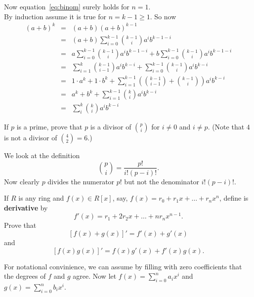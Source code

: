 \begin{myenumerate}
Now equation~\ref{eq:binom} surely holds for \(n=1\).\\
By induction assume it is true for \(n=k-1\geq 1\).
So now
\begin{eqnarray*}
(a+b)^k
  & = & (a+b)(a+b)^{k-1}\\
  & = & (a+b) \sum_{i=0}^{k-1} {\binom{k-1}{i}} a^ib^{k-1-i} \\
  & = & a \sum_{i=0}^{k-1} {\binom{k-1}{i}} a^ib^{k-1-i} +
        b \sum_{i=0}^{k-1} {\binom{k-1}{i}} a^ib^{k-1-i} \\
  & = & \sum_{i=1}^k {\binom{k-1}{i-1}} a^ib^{k-i} +
        \sum_{i=0}^{k-1} {\binom{k-1}{i}} a^ib^{k-i} \\
  & = & 1\cdot a^k + 1\cdot b^k +
        \sum_{i=1}^{k-1}
          \left(\binom{k-1}{i-1} + \binom{k-1}{i}\right)a^ib^{k-i} \\
  & = & a^k + b^k +
        \sum_{i=1}^{k-1} \binom{k}{i}a^ib^{k-i} \\
  & = & \sum_i^k \binom{k}{i}a^ib^{k-i}
\end{eqnarray*}


\item
\begin{excopy}
If $p$ is a prime, prove that $p$ is a divisor of \(\binom{p}{i}\)
 for \(i\neq 0\) and \(i\neq p\).
(Note that $4$ is not a divisor of \(\binom{4}{2}=6\).)
\end{excopy}

We look at the definition
\[\binom{p}{i} = \frac{p!}{i!(p-i)!}.\]
Now clearly $p$ divides the numerator \(p!\) but not the
denominator \(i!(p-i)!\).

\item
\begin{excopy}
If $R$ is any ring and \(f(x)\in R[x]\), say,
\(f(x)=r_0+r_1x+\ldots+r_nx^n\), define is
\textbf{derivative} by
\begin{equation}
f'(x) = r_1+2r_2x+\ldots+nr_n x^{n-1}.
\end{equation}
Prove that
\begin{equation} \label{eq:deriv:add}
[f(x)+g(x)]'=f'(x)+g'(x)
\end{equation}
and
\begin{equation} \label{eq:deriv:mult}
[f(x)g(x)]' = f(x)g'(x) +f'(x)g(x).
\end{equation}
\end{excopy}

For notational convinience, we can assume
by filling with zero coefficients that the degrees of $f$ and $g$ agree.
Now let
\(f(x)=\sum_{i=0}^n a_ix^i\) and
\(g(x)=\sum_{i=0}^n b_ix^i\).


\end{myenumerate}
